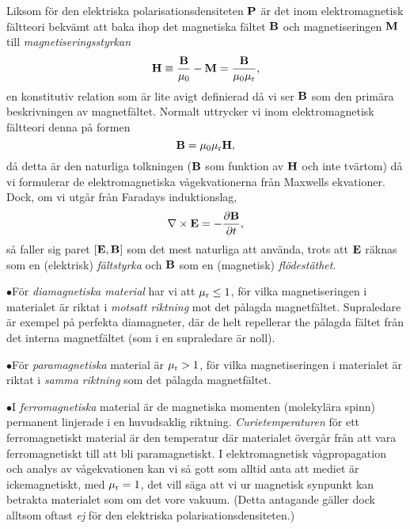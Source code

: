 Liksom f{\"o}r den elektriska polarisationsdensiteten ${\bf P}$ {\"a}r det
inom elektromagnetisk f{\"a}ltteori bekv{\"a}mt att baka ihop det magnetiska
f{\"a}ltet ${\bf B}$ och magnetiseringen ${\bf M}$ till
{\it magnetiseringsstyrkan}
$$
  {\bf H}\equiv{{\bf B}\over{\mu_0}}-{\bf M}
    ={{\bf B}\over{\mu_0\mu_{\rm r}}},
$$
en konstitutiv relation som {\"a}r lite avigt definierad d{\aa} vi ser ${\bf B}$
som den prim{\"a}ra beskrivningen av magnetf{\"a}ltet. Normalt uttrycker vi inom
elektromagnetisk f{\"a}ltteori denna p{\aa} formen
$$
  {\bf B}=\mu_0\mu_{\rm r}{\bf H},
$$
d{\aa} detta {\"a}r den naturliga tolkningen (${\bf B}$ som funktion av
${\bf H}$ och inte tv{\"a}rtom) d{\aa} vi formulerar de elektromagnetiska
v{\aa}gekvationerna fr{\aa}n Maxwells ekvationer. Dock, om vi utg{\aa}r
fr{\aa}n Faradays induktionslag,
$$
  \nabla\times{\bf E}=-{{\partial{\bf B}}\over{\partial t}},
$$
s{\aa} faller sig paret $[{\bf E},{\bf B}]$ som det mest naturliga att
anv{\"a}nda, trots att ${\bf E}$ r{\"a}knas som en (elektrisk)
{\it f{\"a}ltstyrka} och ${\bf B}$ som en (magnetisk)
{\it fl{\"o}dest{\"a}thet}.
\medskip
\item{$\bullet$}{F{\"o}r {\it diamagnetiska material} har vi att
   $\mu_{\rm r}\le 1$, f{\"o}r vilka magnetiseringen i materialet {\"a}r riktat
   i {\it motsatt riktning} mot det p{\aa}lagda magnetf{\"a}ltet.
   Supraledare {\"a}r exempel p{\aa} perfekta diamagneter, d{\"a}r de helt
   repellerar the p{\aa}lagda f{\"a}ltet fr{\aa}n det interna magnetf{\"a}ltet
   (som i en supraledare {\"a}r noll).}
\item{$\bullet$}{F{\"o}r {\it paramagnetiska} material {\"a}r $\mu_{\rm r}>1$,
   f{\"o}r vilka magnetiseringen i materialet {\"a}r riktat i {\it samma
   riktning} som det p{\aa}lagda magnetf{\"a}ltet.}
\item{$\bullet$}{I {\it ferromagnetiska} material {\"a}r de magnetiska
   momenten (molekyl{\"a}ra spinn) permanent linjerade i en huvudsaklig
   riktning. {\it Curietemperaturen} f{\"o}r ett ferromagnetiskt material
   {\"a}r den temperatur d{\"a}r materialet {\"o}verg{\aa}r fr{\aa}n att
   vara ferromagnetiskt till att bli paramagnetiskt.}
\medskip
\noindent
I elektromagnetisk v{\aa}gpropagation och analys av v{\aa}gekvationen kan vi
s{\aa} gott som alltid anta att mediet {\"a}r ickemagnetiskt, med
$\mu_{\rm r}=1$, det vill s{\"a}ga att vi ur magnetisk synpunkt kan betrakta
materialet som om det vore vakuum. (Detta antagande g{\"a}ller dock alltsom
oftast {\it ej} f{\"o}r den elektriska polarisationsdensiteten.)

